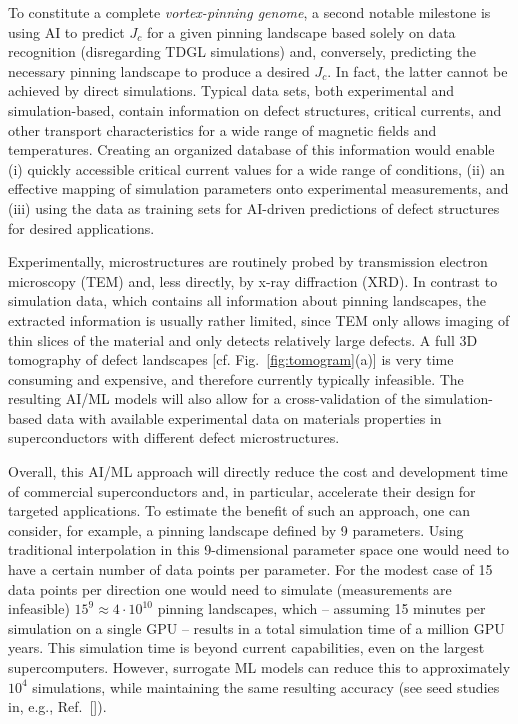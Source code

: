 \documentclass[%
 aip,
 amsmath,amssymb,
 reprint,%
floatfix]{revtex4-1}
\newcommand{\Jc}{J_{c}}
\begin{document}
To constitute a complete \textit{vortex-pinning genome}, a second notable milestone is using AI to predict $\Jc$ for a given pinning landscape based solely on data recognition (disregarding TDGL simulations) and, conversely, predicting the necessary pinning landscape to produce a desired $\Jc$. In fact, the latter cannot be achieved by direct simulations.   Typical data sets, both experimental and simulation-based, contain information on defect structures, critical currents, and other transport characteristics for a wide range of magnetic fields and temperatures. Creating an organized database of this information would enable (i) quickly accessible critical current values for a wide range of conditions, (ii) an effective mapping of simulation parameters onto experimental measurements, and (iii) using the data as training sets for AI-driven predictions of defect structures for desired applications.


Experimentally, microstructures are routinely probed by transmission electron microscopy (TEM) and, less directly, by x-ray diffraction (XRD). In contrast to simulation data, which contains all information about pinning landscapes, the extracted information is usually rather limited, since TEM only allows imaging of thin slices of the material and only detects relatively large defects. A full 3D tomography of defect landscapes [cf. Fig.~\ref{fig:tomogram}(a)] is very time consuming and expensive, and therefore currently typically infeasible. The resulting AI/ML models will also allow for a cross-validation of the simulation-based data with available experimental data on materials properties in superconductors with different defect microstructures. 


Overall, this AI/ML approach will directly reduce the cost and development time of commercial superconductors and, in particular, accelerate their design for targeted applications.
To estimate the benefit of such an approach, one can consider, for example, a pinning landscape defined by 9 parameters. Using traditional interpolation in this 9-dimensional parameter space one would need to have a certain number of data points per parameter. 
For the modest case of 15 data points per direction one would need to simulate (measurements are infeasible) $15^9\approx 4\cdot 10^{10}$ pinning landscapes, which -- assuming 15 minutes per simulation on a single GPU -- results in a total simulation time of a million GPU years. This simulation time is beyond current capabilities, even on the largest supercomputers. However, surrogate ML models can reduce this to approximately $10^4$ simulations, while maintaining the same resulting accuracy (see seed studies in, e.g., Ref.~[]).
\end{document}
